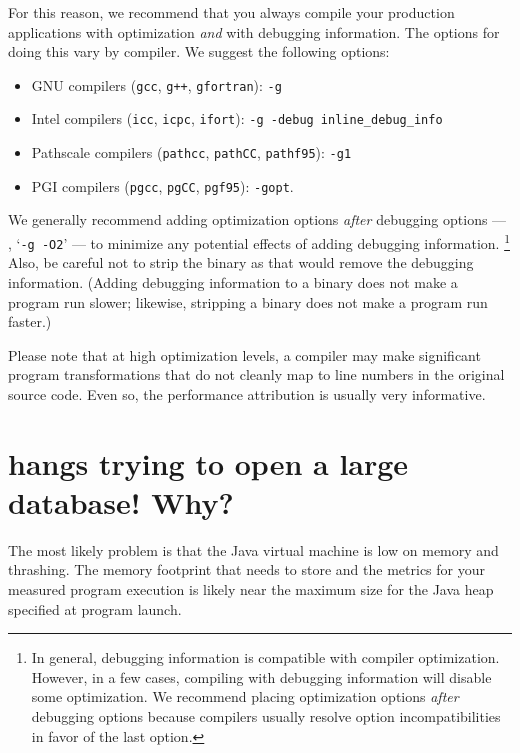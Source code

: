 \documentclass[11pt,letterpaper]{report}
\begin{document}
For this reason, we recommend that you always compile your production applications with optimization \emph{and} with debugging information.
The options for doing this vary by compiler.
We suggest the following options:
\begin{itemize}
\item GNU compilers (\texttt{gcc}, \texttt{g++}, \texttt{gfortran}): \texttt{-g}
\item Intel compilers (\texttt{icc}, \texttt{icpc}, \texttt{ifort}): \texttt{-g -debug inline\_debug\_info}
\item Pathscale compilers (\texttt{pathcc}, \texttt{pathCC}, \texttt{pathf95}): \texttt{-g1}
\item PGI compilers (\texttt{pgcc}, \texttt{pgCC}, \texttt{pgf95}): \texttt{-gopt}.
\end{itemize}
We generally recommend adding optimization options \emph{after} debugging options --- \eg{}, `\texttt{-g -O2}' --- to minimize any potential effects of adding debugging information.%
\footnote{In general, debugging information is compatible with compiler optimization.
However, in a few cases, compiling with debugging information will disable some optimization.
We recommend placing optimization options \emph{after} debugging options because compilers usually resolve option incompatibilities in favor of the last option.}
Also, be careful not to strip the binary as that would remove the debugging information.
(Adding debugging information to a binary does not make a program run slower; likewise, stripping a binary does not make a program run faster.)

Please note that at high optimization levels, a compiler may make significant program transformations that do not cleanly map to line numbers in the original source code.
Even so, the performance attribution is usually very informative.



\section{\hpcviewer{} hangs trying to open a large database! Why?}

The most likely problem is that the Java virtual machine is low on memory and thrashing. The memory footprint that \hpcviewer{} needs to store and the metrics for your measured program execution is likely near the maximum size for the Java heap specified at program launch.  
\end{document}

